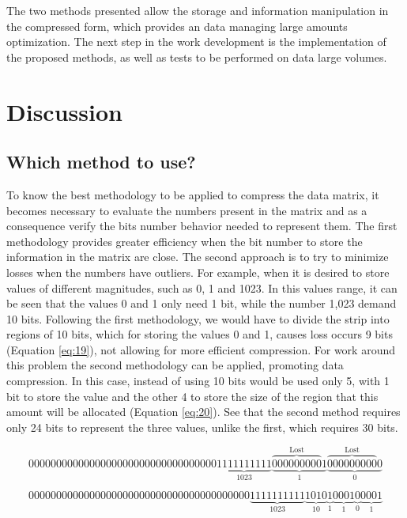 \documentclass[10pt]{article}
\begin{document}
The two methods presented allow the storage and information manipulation in the compressed form, which provides an data managing large amounts optimization. The next step in the work development is the implementation of the proposed methods, as well as tests to be performed on data large volumes.

\section*{Discussion}

\subsection*{Which method to use?}

To know the best methodology to be applied to compress the data matrix, it becomes necessary to evaluate the numbers present in the matrix and as a consequence verify the bits number behavior needed to represent them. The first methodology provides greater efficiency when the bit number to store the information in the matrix are close. The second approach is to try to minimize losses when the numbers have outliers. For example, when it is desired to store values ​​of different magnitudes, such as 0, 1 and 1023. In this values range​​, it can be seen that the values ​​0 and 1 only need 1 bit, while the number 1,023 demand 10 bits. Following the first methodology, we would have to divide the strip into regions of 10 bits, which for storing the values ​​0 and 1, causes loss occurs 9 bits (Equation \ref{eq:19}), not allowing for more efficient compression. For work around this problem the second methodology can be applied, promoting data compression. In this case, instead of using 10 bits would be used 
only 5, with 1 bit to store the value and the other 4 to store the size of the region that this amount will be allocated (Equation \ref{eq:20}). See that the second method requires only 24 bits to represent the three values​​, unlike the first, which requires 30 bits.

\begin{equation} \label{eq:19}
 0000000000000000000000000000000000\underbrace{1111111111}_{1023}\underbrace{\overbrace{000000000}^{\text{Lost}}1}_{1}\underbrace{\overbrace{000000000}^{\text{Lost}}0}_{0}
\end{equation}

\begin{equation} \label{eq:20}
 0000000000000000000000000000000000000000\underbrace{1111111111}_{1023}\underbrace{1010}_{10}\underbrace{1}_{1}\underbrace{0001}_{1}\underbrace{0}_{0}\underbrace{0001}_{1}
\end{equation}
\end{document}
